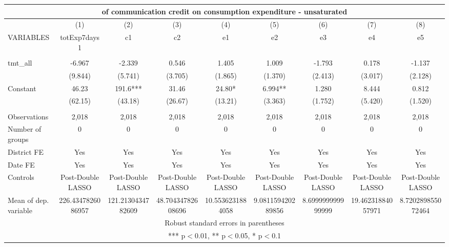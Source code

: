 \documentclass[]{article}
\begin{document}
\begin{tabular}{lcccccccc}
\multicolumn{9}{c}{ of communication credit on consumption expenditure - unsaturated} \\ \hline
 & (1) & (2) & (3) & (4) & (5) & (6) & (7) & (8) \\
VARIABLES & totExp7days1 & c1 & c2 & e1 & e2 & e3 & e4 & e5 \\ \hline
 &  &  &  &  &  &  &  &  \\
tmt\_all & -6.967 & -2.339 & 0.546 & 1.405 & 1.009 & -1.793 & 0.178 & -1.137 \\
 & (9.844) & (5.741) & (3.705) & (1.865) & (1.370) & (2.413) & (3.017) & (2.128) \\
Constant & 46.23 & 191.6*** & 31.46 & 24.80* & 6.994** & 1.280 & 8.444 & 0.812 \\
 & (62.15) & (43.18) & (26.67) & (13.21) & (3.363) & (1.752) & (5.420) & (1.520) \\
 &  &  &  &  &  &  &  &  \\
Observations & 2,018 & 2,018 & 2,018 & 2,018 & 2,018 & 2,018 & 2,018 & 2,018 \\
Number of groups & 0 & 0 & 0 & 0 & 0 & 0 & 0 & 0 \\
District FE & Yes & Yes & Yes & Yes & Yes & Yes & Yes & Yes \\
Date FE & Yes & Yes & Yes & Yes & Yes & Yes & Yes & Yes \\
Controls & Post-Double LASSO & Post-Double LASSO & Post-Double LASSO & Post-Double LASSO & Post-Double LASSO & Post-Double LASSO & Post-Double LASSO & Post-Double LASSO \\
 Mean of dep. variable & 226.4347826086957 & 121.2130434782609 & 48.70434782608696 & 10.5536231884058 & 9.081159420289856 & 8.699999999999999 & 19.46231884057971 & 8.720289855072464 \\ \hline
\multicolumn{9}{c}{ Robust standard errors in parentheses} \\
\multicolumn{9}{c}{ *** p$<$0.01, ** p$<$0.05, * p$<$0.1} \\
\end{tabular}
\end{document}
